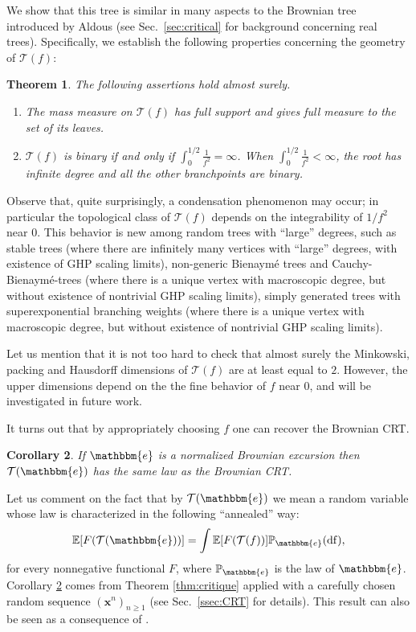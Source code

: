 \documentclass[11pt]{article}
\theoremstyle{plain}
\newtheorem{theorem}{Theorem}[section]
\newtheorem{corollary}[theorem]{Corollary}
\theoremstyle{definition}
\theoremstyle{remark}
\renewcommand{\P}{{\mathbb{P}}} %
\newcommand{\1}{\mathbbm{1}} %
\newcommand{\esp}[1]{\mathbb{E}\left[#1\right]} %
\newcommand{\proba}[1]{\mathbb{P}\left(#1\right)} %
\newcommand{\T}{\mathcal{T}} %
\newcommand{\Xb}{\mathrm{\mathbf{x}}} %
\let\originalleft\left
\let\originalright\right
\renewcommand{\left}{\mathopen{}\mathclose\bgroup\originalleft}
\renewcommand{\right}{\aftergroup\egroup\originalright}
\begin{document}
We show that this tree is similar in many aspects to the Brownian tree introduced by Aldous \cite{Ald91} (see Sec.~\ref{sec:critical} for background concerning real trees). Specifically, we establish the following properties concerning the geometry of $ \mathcal{T}(f)$:

\pagebreak[2]
\begin{theorem}
\label{thm:properties}
The following assertions hold almost surely.
\begin{enumerate}
\item[(1)] The mass measure on $\T(f)$ has full support and gives full measure to the set of its leaves.
\item[(2)] $\T(f)$ is binary if and only if $\int_0^{1/2} \frac{1}{f^2}=\infty$. When $\int_0^{1/2} \frac{1}{f^2}<\infty$, the root has infinite degree and all the other branchpoints are binary.
\end{enumerate}
\end{theorem}

Observe that, quite surprisingly, {a condensation phenomenon may occur; in particular} the {topological} class of $\T(f)$ depends on the integrability of $1/f^{2}$ near $0$. {This behavior is new among random trees with ``large'' degrees, such as stable trees \cite{LGLJ98,DLG02} (where there are infinitely many vertices with ``large'' degrees, with existence of GHP scaling limits), non-generic Bienaymé trees \cite{JS11,Jan12,Kor15}  and Cauchy-Bienaymé-trees \cite{KR19} (where there is a unique vertex with macroscopic degree, but without existence of nontrivial GHP scaling limits), simply generated trees with superexponential branching weights \cite{JJS11} (where there is a unique vertex with macroscopic degree, but without existence of nontrivial  GHP scaling limits).}
 

Let us mention that it is not too hard to check that  almost surely the Minkowski, packing and Hausdorff  dimensions of $\mathcal{T}(f)$ are at least equal to $2$. However, the upper dimensions depend on the the fine behavior of $f$ near $0$, and will be investigated in future work.


It turns out that by appropriately choosing $f$ one can recover the Brownian CRT.
\begin{corollary}
\label{cor:CRT}
If $\mathbbm{e}$ is a normalized Brownian excursion then $\T(\mathbbm{e})$ has the same law as the Brownian CRT.
\end{corollary}
{Let us comment on the fact that by $\T(\mathbbm{e})$ we mean a random variable whose law is characterized in the following ``annealed'' way:
\[
\esp{F(\T(\mathbbm{e}))}= \int \esp{F (\T(f))} \P_{\mathbbm{e}}(\mathrm{df}),
\]
for every nonnegative functional $F$, where $\P_{\mathbbm{e}}$ is the law of $\mathbbm{e}$.
}
Corollary \ref{cor:CRT} comes from Theorem \ref{thm:critique} applied with a carefully chosen random sequence $(\Xb^n)_{n \geq 1}$ (see Sec.~\ref{ssec:CRT} for details). {This result can also be seen as a consequence of {\cite[Theorem 2]{A98}}.}
\end{document}
